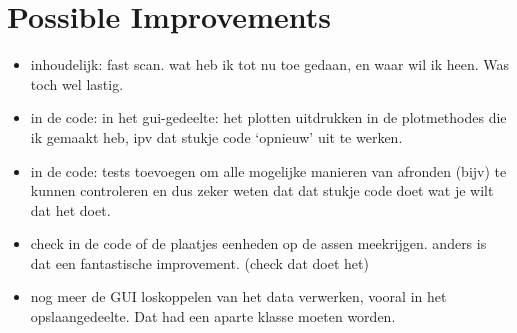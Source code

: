 
\section{Possible Improvements}
\begin{itemize}
\item inhoudelijk: fast scan. wat heb ik tot nu toe gedaan, en waar wil ik heen. Was toch wel lastig.
\item in de code: in het gui-gedeelte: het plotten uitdrukken in de plotmethodes die ik gemaakt heb, ipv dat stukje code `opnieuw' uit te werken.
\item in de code: tests toevoegen om alle mogelijke manieren van afronden (bijv) te kunnen controleren en dus zeker weten dat dat stukje code doet wat je wilt dat het doet.
\item check in de code of de plaatjes eenheden op de assen meekrijgen. anders is dat een fantastische improvement. (check dat doet het)
\item nog meer de GUI loskoppelen van het data verwerken, vooral in het opslaangedeelte. Dat had een aparte klasse moeten worden.
\end{itemize}



